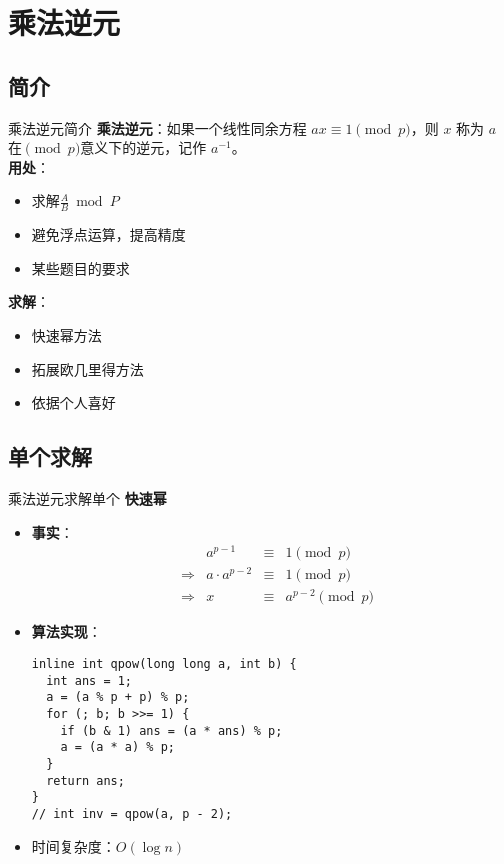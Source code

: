 \section{乘法逆元}
\subsection{简介}
\begin{frame}[fragile]{乘法逆元}{简介}
  \textbf{乘法逆元}：如果一个线性同余方程 $ax \equiv 1 \pmod p$，则 $x$ 称为 $a$ 在$\pmod{p}$意义下的逆元，记作 $a^{-1}$。\\
  
  \pause
  \vspace{0.5cm}
  \textbf{用处}：
  \begin{itemize}
    \item 求解$\frac{A}{B}\bmod{P}$
    \item 避免浮点运算，提高精度
    \item 某些题目的要求
  \end{itemize}
  
  \pause 
  \vspace{0.5cm}
  \textbf{求解}：
  \begin{itemize}
    \item 快速幂方法
    \item 拓展欧几里得方法
    \pause
    \item 依据个人喜好
  \end{itemize}

\end{frame}

\subsection{单个求解}
\begin{frame}[fragile]{乘法逆元}{求解单个}
  \textbf{快速幂}
  \begin{itemize}
    \item \textbf{事实}：
    $$
    \begin{aligned}
       &\;& a^{p-1} &\equiv& 1 \pmod p \\
      &\Rightarrow& a\cdot a^{p-2} &\equiv& 1 \pmod p \\ 
      &\Rightarrow& x &\equiv& a^{p-2} \pmod p
    \end{aligned}
    $$
    \pause 
    \item \textbf{算法实现}：
    \begin{lstlisting}
inline int qpow(long long a, int b) {
  int ans = 1;
  a = (a % p + p) % p;
  for (; b; b >>= 1) {
    if (b & 1) ans = (a * ans) % p;
    a = (a * a) % p;
  }
  return ans;
}
// int inv = qpow(a, p - 2);
    \end{lstlisting}
    \pause 
    \item 时间复杂度：$O(\log{n})$
  \end{itemize}
\end{frame}

